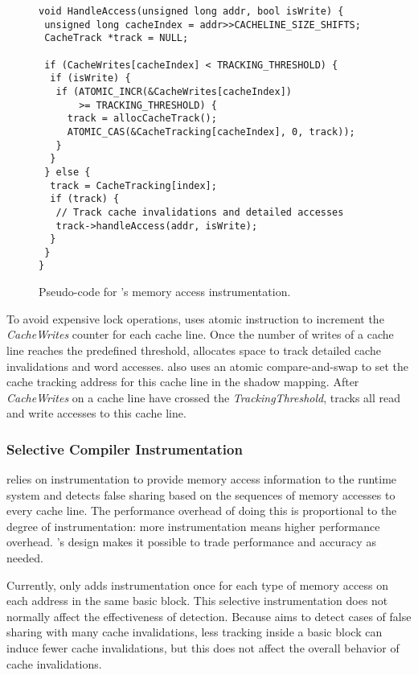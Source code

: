 \begin{figure}[!t]
\begin{lstlisting}
void HandleAccess(unsigned long addr, bool isWrite) {
 unsigned long cacheIndex = addr>>CACHELINE_SIZE_SHIFTS;
 CacheTrack *track = NULL;

 if (CacheWrites[cacheIndex] < TRACKING_THRESHOLD) {
  if (isWrite) {
   if (ATOMIC_INCR(&CacheWrites[cacheIndex]) 
       >= TRACKING_THRESHOLD) {
     track = allocCacheTrack();
     ATOMIC_CAS(&CacheTracking[cacheIndex], 0, track));
   }
  } 
 } else {
  track = CacheTracking[index];
  if (track) {
   // Track cache invalidations and detailed accesses
   track->handleAccess(addr, isWrite);
  }
 }
}
\end{lstlisting}
\caption{Pseudo-code for \Predator{}'s memory access instrumentation.\label{fig:algorithm}}
\end{figure}

To avoid expensive lock operations, \Predator{} uses atomic instruction to increment 
the {\it CacheWrites} counter for each cache line. 
Once the number of writes of a cache line reaches the predefined threshold,
\Predator{} allocates space to track detailed cache invalidations and word accesses.
\Predator{} also 
uses an atomic compare-and-swap to set the cache tracking address for this cache line in
the shadow mapping.
After {\it CacheWrites} on a cache line have crossed the {\it TrackingThreshold}, 
\Predator{} tracks all read and write accesses to this cache line.



\subsubsection{Selective Compiler Instrumentation}
\label{sec:selectinstrumentation}

\Predator{} relies on instrumentation to provide memory access information to the runtime system 
and detects false sharing based on the sequences of memory accesses to every cache line. 
The performance overhead of doing this is proportional to 
the degree of instrumentation: more 
instrumentation means higher performance overhead. \Predator{}'s design makes it possible to trade performance and accuracy as needed.

Currently, \Predator{} only adds instrumentation once for each type of memory access on each address 
in the same basic block. 
This selective instrumentation does not normally affect the effectiveness of detection. 
Because \Predator{} aims to detect cases of false sharing with many cache invalidations,
less tracking inside a basic block can induce fewer cache invalidations, 
but this does not affect the overall behavior of cache invalidations. 


